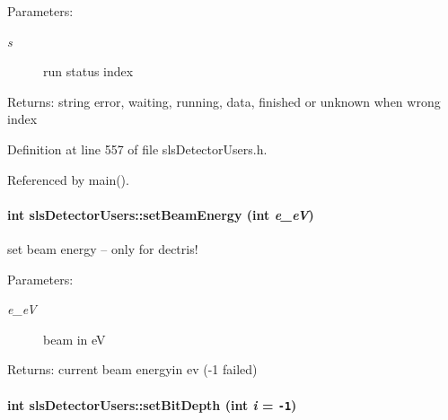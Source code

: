 \begin{Desc}
\item[Parameters:]
\begin{description}
\item[{\em s}]run status index \end{description}
\end{Desc}
\begin{Desc}
\item[Returns:]string error, waiting, running, data, finished or unknown when wrong index \end{Desc}


Definition at line 557 of file sls\-Detector\-Users.h.

Referenced by main().\hypertarget{classslsDetectorUsers_475938986407804877df4dcece97cc19}{
\paragraph[setBeamEnergy]{\setlength{\rightskip}{0pt plus 5cm}int sls\-Detector\-Users::set\-Beam\-Energy (int {\em e\_\-e\-V})}\hfill}
\label{classslsDetectorUsers_475938986407804877df4dcece97cc19}


set beam energy -- only for dectris! 

\begin{Desc}
\item[Parameters:]
\begin{description}
\item[{\em e\_\-e\-V}]beam in e\-V \end{description}
\end{Desc}
\begin{Desc}
\item[Returns:]current beam energyin ev (-1 failed) \end{Desc}
\hypertarget{classslsDetectorUsers_ff667cf0665154cdff5d5f3dbc3526ba}{
\paragraph[setBitDepth]{\setlength{\rightskip}{0pt plus 5cm}int sls\-Detector\-Users::set\-Bit\-Depth (int {\em i} = {\tt -1})}\hfill}
\label{classslsDetectorUsers_ff667cf0665154cdff5d5f3dbc3526ba}


